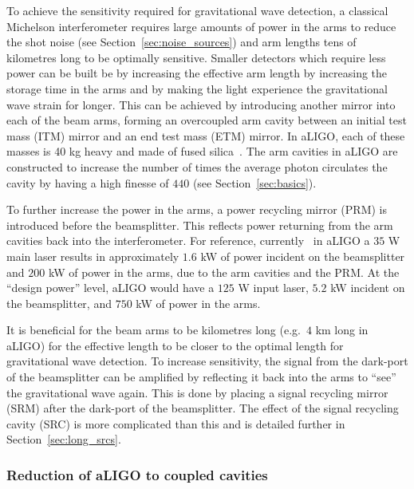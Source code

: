 \documentclass[aps,pra,superscriptaddress,reprint,nofootinbib]{revtex4-1}
\begin{document}
To achieve the sensitivity required for gravitational wave detection, a classical Michelson interferometer requires large amounts of power in the arms to reduce the shot noise (see Section~\ref{sec:noise_sources}) and arm lengths tens of kilometres long to be optimally sensitive.
Smaller detectors which require less power can be built be by increasing the effective arm length by increasing the storage time in the arms and by making the light experience the gravitational wave strain for longer. This can be achieved by introducing another mirror into each of the beam arms, forming an overcoupled arm cavity between an initial test mass (ITM) mirror and an end test mass (ETM) mirror. In aLIGO, each of these masses is 40 kg heavy and made of fused silica~\cite{AdvancedLIGO:2015}. The arm cavities in aLIGO are constructed to increase the number of times the average photon circulates the cavity by having a high finesse of $440$ (see Section~\ref{sec:basics}).


To further increase the power in the arms, a power recycling mirror (PRM) is introduced before the beamsplitter. This reflects power returning from the arm cavities back into the interferometer. For reference, currently~\cite{Buikema_2020} in aLIGO a $35$ W main laser results in approximately $1.6$ kW of power incident on the beamsplitter and $200$ kW of power in the arms, due to the arm cavities and the PRM. At the ``design power'' level, aLIGO would have a $125$ W input laser, $5.2$ kW incident on the beamsplitter, and $750$ kW of power in the arms.


It is beneficial for the beam arms to be kilometres long (e.g.\ $4$ km long in aLIGO) for the effective length to be closer to the optimal length for gravitational wave detection. To increase sensitivity, the signal from the dark-port of the beamsplitter can be amplified by reflecting it back into the arms to ``see'' the gravitational wave again. This is done by placing a signal recycling mirror (SRM) after the dark-port of the beamsplitter. The effect of the signal recycling cavity (SRC) is more complicated than this and is detailed further in Section~\ref{sec:long_srcs}.


\subsubsection{Reduction of aLIGO to coupled cavities}
\end{document}

